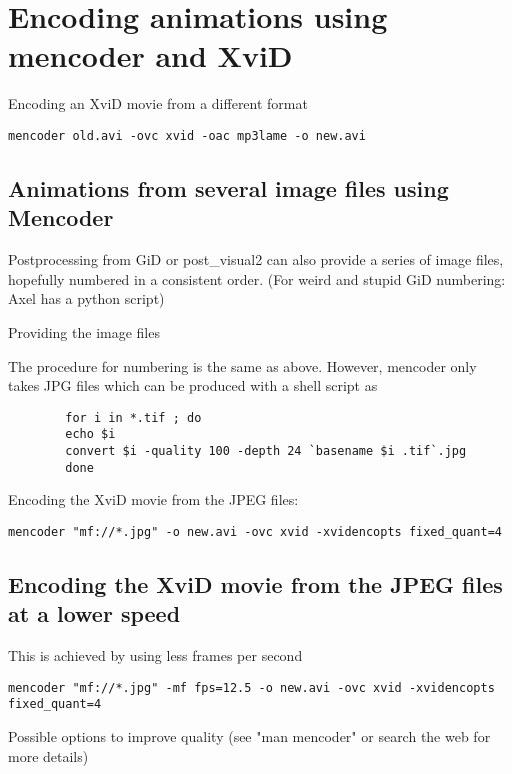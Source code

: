 \section{Encoding animations using mencoder and XviD}

 Encoding an XviD movie from a different format

\begin{verbatim}
mencoder old.avi -ovc xvid -oac mp3lame -o new.avi
\end{verbatim}

\subsection{Animations from several image files using Mencoder}

 Postprocessing from GiD or post\_visual2 can also provide a series of
image files, hopefully numbered in a consistent order. (For weird and
stupid GiD numbering: Axel has a python script)

Providing the image files

 The procedure for numbering is the same as above. However, mencoder
only takes JPG files which can be produced with a shell script as

\begin{verbatim}
        for i in *.tif ; do
        echo $i
        convert $i -quality 100 -depth 24 `basename $i .tif`.jpg
        done
\end{verbatim}

Encoding the XviD movie from the JPEG files:

\begin{verbatim}
mencoder "mf://*.jpg" -o new.avi -ovc xvid -xvidencopts fixed_quant=4
\end{verbatim}

\subsection{Encoding the XviD movie from the JPEG files at a lower speed}

 This is achieved by using less frames per second

\begin{verbatim}
mencoder "mf://*.jpg" -mf fps=12.5 -o new.avi -ovc xvid -xvidencopts fixed_quant=4
\end{verbatim}

Possible options to improve quality 
 (see "man mencoder" or search the web for more details)

